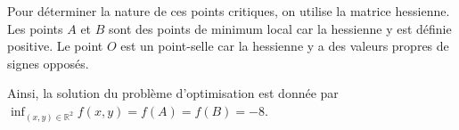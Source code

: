 {\begin{enumerate}
{  Pour déterminer la nature de ces points critiques, on utilise la matrice hessienne. Les points $A$ et $B$ sont des points de minimum local car la hessienne y est définie positive. Le point $O$ est un point-selle car la hessienne y a des valeurs propres de signes opposés.

  Ainsi, la solution du problème d'optimisation est donnée par $\inf_{(x,y) \in \mathbb{R}^2} f(x, y) = f(A) = f(B) = -8$.}
\end{enumerate}
}
